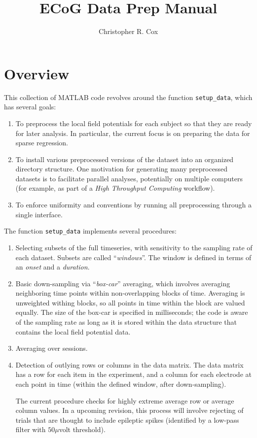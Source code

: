 \documentclass[12pt,a4paper]{article}
\author{Christopher R. Cox}
\title{ECoG Data Prep Manual}
\newcommand{\matlab}[0]{MATLAB\textsuperscript{\textregistered}}
\begin{document}
	\maketitle
	
\section{Overview}
This collection of \matlab{} code revolves around the function \texttt{setup\_data}, which has several goals:

\begin{enumerate}
	\item
	To preprocess the local field potentials for each subject so that they are ready for later analysis.
	In particular, the current focus is on preparing the data for sparse regression.
	\item
	To install various preprocessed versions of the dataset into an organized directory structure.
	One motivation for generating many preprocessed datasets is to facilitate parallel analyses, potentially on multiple computers (for example, as part of a \emph{High Throughput Computing} workflow).
	\item
	To enforce uniformity and conventions by running all preprocessing through a single interface.
\end{enumerate}

The function \texttt{setup\_data} implements several procedures:

\begin{enumerate}
	\item
	Selecting subsets of the full timeseries, with sensitivity to the sampling rate of each dataset.
	Subsets are called ``\emph{windows}''.
	The window is defined in terms of an \emph{onset} and a \emph{duration}.
	\item
	Basic down-sampling via ``\emph{box-car}'' averaging, which involves averaging neighboring time points within non-overlapping blocks of time.
	Averaging is unweighted withing blocks, so all points in time within the block are valued equally.
	The size of the box-car is specified in milliseconds; the code is aware of the sampling rate as long as it is stored within the data structure that contains the local field potential data.
	\item
	Averaging over sessions.
	\item
	Detection of outlying rows or columns in the data matrix.
	The data matrix has a row for each item in the experiment, and a column for each electrode at each point in time (within the defined window, after down-sampling).
	
	The current procedure checks for highly extreme average row or average column values.
	In a upcoming revision, this process will involve rejecting of trials that are thought to include epileptic spikes (identified by a low-pass filter with $50 \mu$volt threshold).
\end{enumerate}
\end{document}
